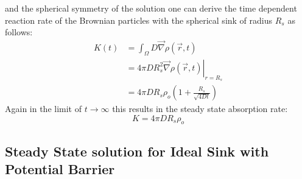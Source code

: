 and the spherical symmetry of the solution one can derive the time dependent reaction rate of the Brownian particles with the spherical sink of radius $R_s$ as follows:
\begin{align}
    K(t) &= \int_\Omega D  \vec{\nabla} \rho(\vec{r},t) \\
    &= 4 \pi D R_s^2 \left. \vec{\nabla} \rho(\vec{r},t) \right|_{r = R_s}\\
    &= 4 \pi D R_s \rho_o \left( 1 + \frac{R_s}{\sqrt{4Dt}} \right)
    \label{ideal reaction rate}
\end{align}
Again in the limit of $t \rightarrow \infty$ this results in the steady state absorption rate:
\begin{equation}
    K = 4 \pi D R_s \rho_o
    \label{steady state ideal rate}
\end{equation}

\subsection{Steady State solution for Ideal Sink with Potential Barrier}

